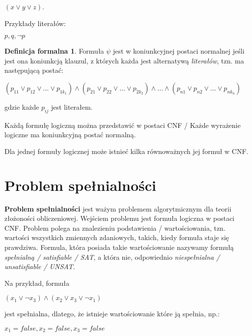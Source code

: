\documentclass[a4paper,12pt,oneside]{book}
\theoremstyle{definition}
\newtheorem*{formal}{Definicja formalna}
\begin{document}
\begin{center}
    $(x \lor y \lor z)$. 
\end{center}

Przykłady literałów:

\begin{center}
    $p, q, \neg p$
\end{center}

\begin{formal}
    Formuła $\psi$ jest w koniunkcyjnej postaci normalnej jeśli jest ona koniunkcją klauzul, z których każda jest alternatywą \textit{literałów}, tzn. ma następującą postać: 
    \begin{center}
    $(p_{11} \lor p_{12} \lor \ldots \lor p_{1{k_1}}) \land (p_{21} \lor p_{22} \lor \ldots \lor p_{2{k_2}}) \land \ldots \land (p_{n1} \lor p_{n2} \lor \ldots \lor p_{n{k_n}})$
    \end{center}
    gdzie każde $p_{ij}$ jest literałem.
\end{formal}

Każdą formułę logiczną można przedstawić w postaci CNF / Każde wyrażenie logiczne ma koniunkcyjną postać normalną.

Dla jednej formuły logicznej może istnieć kilka równoważnych jej formuł w CNF.  

\section{Problem spełnialności}

\textbf{Problem spełnialności} jest ważym problemem algorytmicznym dla teorii złożoności obliczeniowej. Wejściem problemu jest formuła logiczna w postaci CNF. Problem polega na znalezieniu podstawienia / wartościowania, tzn. wartości wszystkich zmiennych zdaniowych, takich, kiedy formuła staje się prawdziwa. Formula, która posiada takie wartościowanie nazywamy formułą \textit{spełnialną / satisfiable / SAT}, a która nie, odpowiednio \textit{niespełnialna / unsatisfiable / UNSAT}.

Na przykład, formuła
\begin{center}
    $(x_1 \lor \neg x_3) \land (x_2 \lor x_3 \lor \neg x_1)$
\end{center}

jest spełnialna, dlatego, że istnieje wartościowanie które ją spełnia, np.:
\begin{center}
    $x_1 = false, x_2 = false, x_3 = false$
\end{center}
\end{document}
